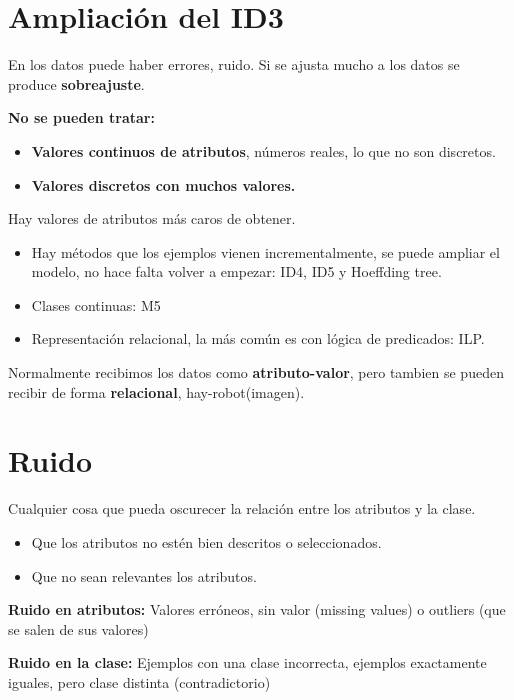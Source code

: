 \documentclass[12pt]{report} %
\begin{document}
\section{Ampliación del ID3}

En los datos puede haber errores, ruido. Si se ajusta mucho a los datos
se produce \textbf{sobreajuste}.

\textbf{No se pueden tratar:}

\begin{itemize}

\item
  \textbf{Valores continuos de atributos}, números reales, lo que no son
  discretos.
\item
  \textbf{Valores discretos con muchos valores.}
\end{itemize}

Hay valores de atributos más caros de obtener.

\begin{itemize}
\item
  Hay métodos que los ejemplos vienen incrementalmente, se puede ampliar
  el modelo, no hace falta volver a empezar: ID4, ID5 y Hoeffding tree.
\item
  Clases continuas: M5
\item
  Representación relacional, la más común es con lógica de predicados:
  ILP.
\end{itemize}

Normalmente recibimos los datos como \textbf{atributo-valor}, pero 
tambien se pueden recibir de forma \textbf{relacional}, hay-robot(imagen).

\section{Ruido}

Cualquier cosa que pueda oscurecer la relación entre los atributos y la
clase.

\begin{itemize}

\item
  Que los atributos no estén bien descritos o seleccionados.
\item
  Que no sean relevantes los atributos.
\end{itemize}

\textbf{Ruido en atributos:} Valores erróneos, sin valor (missing
values) o outliers (que se salen de sus valores)

\textbf{Ruido en la clase:} Ejemplos con una clase incorrecta, ejemplos
exactamente iguales, pero clase distinta (contradictorio)
\end{document}
